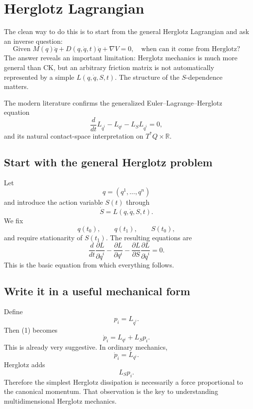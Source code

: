 \section{Herglotz Lagrangian}

The clean way to do this is to start from the general Herglotz Lagrangian and ask an inverse question:
$$ \boxed{\text{Given }M(q)\ddot q+D(q,\dot q,t)\dot q+\nabla V=0, \quad\text{when can it come from Herglotz?}} $$
The answer reveals an important limitation: Herglotz mechanics is much more general than CK, but an arbitrary friction matrix is not automatically represented by a simple \(L(q,\dot q,S,t)\). The structure of the \(S\)-dependence matters.

The modern literature confirms the generalized Euler–Lagrange–Herglotz equation
$$ \frac{d}{dt}L_{\dot q^i}-L_{q^i}-L_S L_{\dot q^i}=0, $$
and its natural contact-space interpretation on \(T^*Q\times\mathbb R\).

\subsection{Start with the general Herglotz problem}

Let $$ q=(q^1,\ldots,q^n) $$
and introduce the action variable \(S(t)\) through
$$ \boxed{ \dot S=L(q,\dot q,S,t). } $$
We fix $$ q(t_0),\qquad q(t_1), \qquad S(t_0), $$
and require stationarity of \(S(t_1)\).
The resulting equations are
\begin{equation}
\frac{d}{dt}\frac{\partial L}{\partial\dot q^i} - \frac{\partial L}{\partial q^i} - \frac{\partial L}{\partial S} \frac{\partial L}{\partial\dot q^i} =0.  \tag{1} 
\end{equation}
This is the basic equation from which everything follows.

\subsection{Write it in a useful mechanical form}

Define $$ p_i=L_{\dot q^i}. $$
Then (1) becomes
\begin{equation}
 \boxed{ \dot p_i=L_{q^i}+L_Sp_i. } \tag{2} 
\end{equation}
This is already very suggestive.
In ordinary mechanics,
$$ \dot p_i=L_{q^i}. $$
Herglotz adds
$$ \boxed{L_Sp_i}. $$
Therefore the simplest Herglotz dissipation is necessarily a force proportional to the canonical momentum.
That observation is the key to understanding multidimensional Herglotz mechanics.

